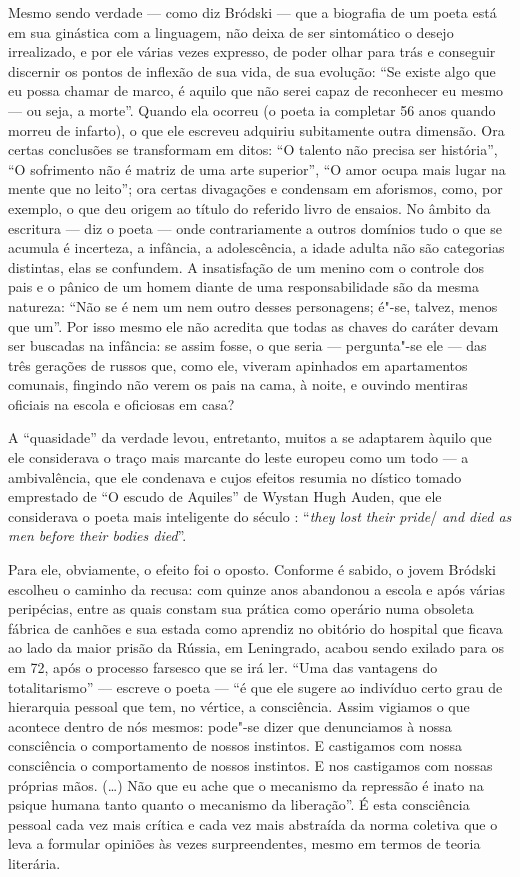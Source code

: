 Mesmo sendo verdade --- como diz Bródski --- que a biografia de um poeta
está em sua ginástica com a linguagem, não deixa de ser sintomático o
desejo irrealizado, e por ele várias vezes expresso, de poder olhar para
trás e conseguir discernir os pontos de inflexão de sua vida, de sua
evolução: ``Se existe algo que eu possa chamar de marco, é aquilo que
não serei capaz de reconhecer eu mesmo --- ou seja, a morte''. Quando ela
ocorreu (o poeta ia completar 56 anos quando morreu de infarto), o que
ele escreveu adquiriu subitamente outra dimensão. Ora certas conclusões
se transformam em ditos: ``O talento não precisa ser história'', ``O
sofrimento não é matriz de uma arte superior'', ``O amor ocupa mais
lugar na mente que no leito''; ora certas divagações e condensam em
aforismos, como, por exemplo, o que deu origem ao título do referido
livro de ensaios. No âmbito da escritura --- diz o poeta --- onde
contrariamente a outros domínios tudo o que se acumula é incerteza, a
infância, a adolescência, a idade adulta não são categorias distintas,
elas se confundem. A insatisfação de um menino com o controle dos pais e
o pânico de um homem diante de uma responsabilidade são da mesma
natureza: ``Não se é nem um nem outro desses personagens; é"-se, talvez,
menos que um''. Por isso mesmo ele não acredita que todas as chaves do
caráter devam ser buscadas na infância: se assim fosse, o que seria ---
pergunta"-se ele --- das três gerações de russos que, como ele, viveram
apinhados em apartamentos comunais, fingindo não verem os pais na cama,
à noite, e ouvindo mentiras oficiais na escola e oficiosas em casa?

A ``quasidade'' da verdade levou, entretanto, muitos a se adaptarem
àquilo que ele considerava o traço mais marcante do leste europeu como
um todo --- a ambivalência, que ele condenava e cujos efeitos resumia no
dístico tomado emprestado de ``O escudo de Aquiles'' de Wystan Hugh
Auden, que ele considerava o poeta mais inteligente do século :
``\emph{they lost their pride}/ \emph{and died as men before their
bodies died}''.

Para ele, obviamente, o efeito foi o oposto. Conforme é sabido, o jovem
Bródski escolheu o caminho da recusa: com quinze anos abandonou a escola
e após várias peripécias, entre as quais constam sua prática como
operário numa obsoleta fábrica de canhões e sua estada como aprendiz no
obitório do hospital que ficava ao lado da maior prisão da Rússia, em
Leningrado, acabou sendo exilado para os  em 72, após o processo
farsesco que se irá ler. ``Uma das vantagens do totalitarismo'' ---
escreve o poeta --- ``é que ele sugere ao indivíduo certo grau de
hierarquia pessoal que tem, no vértice, a consciência. Assim vigiamos o
que acontece dentro de nós mesmos: pode"-se dizer que denunciamos à nossa
consciência o comportamento de nossos instintos. E castigamos com nossa
consciência o comportamento de nossos instintos. E nos castigamos com
nossas próprias mãos. (\ldots{}) Não que eu ache que o mecanismo da repressão
é inato na psique humana tanto quanto o mecanismo da liberação''. É esta
consciência pessoal cada vez mais crítica e cada vez mais abstraída da
norma coletiva que o leva a formular opiniões às vezes surpreendentes,
mesmo em termos de teoria literária.

